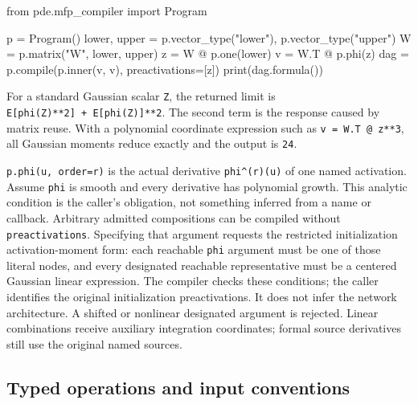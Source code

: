 \documentclass[
  11pt,
]{article}
\newenvironment{Shaded}{\begin{snugshade}}{\end{snugshade}}
\newcommand{\BuiltInTok}[1]{\textcolor[rgb]{0.00,0.23,0.31}{#1}}
\newcommand{\ImportTok}[1]{\textcolor[rgb]{0.00,0.46,0.62}{#1}}
\newcommand{\NormalTok}[1]{\textcolor[rgb]{0.00,0.23,0.31}{#1}}
\newcommand{\OperatorTok}[1]{\textcolor[rgb]{0.37,0.37,0.37}{#1}}
\newcommand{\StringTok}[1]{\textcolor[rgb]{0.13,0.47,0.30}{#1}}
\theoremstyle{definition}
\theoremstyle{plain}
\theoremstyle{plain}
\theoremstyle{plain}
\theoremstyle{remark}
\begin{document}
\begin{Shaded}
\begin{Highlighting}[]
\ImportTok{from}\NormalTok{ pde.mfp\_compiler }\ImportTok{import}\NormalTok{ Program}

\NormalTok{p }\OperatorTok{=}\NormalTok{ Program()}
\NormalTok{lower, upper }\OperatorTok{=}\NormalTok{ p.vector\_type(}\StringTok{"lower"}\NormalTok{), p.vector\_type(}\StringTok{"upper"}\NormalTok{)}
\NormalTok{W }\OperatorTok{=}\NormalTok{ p.matrix(}\StringTok{"W"}\NormalTok{, lower, upper)}
\NormalTok{z }\OperatorTok{=}\NormalTok{ W }\OperatorTok{@}\NormalTok{ p.one(lower)}
\NormalTok{v }\OperatorTok{=}\NormalTok{ W.T }\OperatorTok{@}\NormalTok{ p.phi(z)}
\NormalTok{dag }\OperatorTok{=}\NormalTok{ p.}\BuiltInTok{compile}\NormalTok{(p.inner(v, v), preactivations}\OperatorTok{=}\NormalTok{[z])}
\BuiltInTok{print}\NormalTok{(dag.formula())}
\end{Highlighting}
\end{Shaded}

For a standard Gaussian scalar \texttt{Z}, the returned limit is
\texttt{E{[}phi(Z)**2{]}\ +\ E{[}phi\textquotesingle{}(Z){]}**2}. The
second term is the response caused by matrix reuse. With a polynomial
coordinate expression such as \texttt{v\ =\ W.T\ @\ z**3}, all Gaussian
moments reduce exactly and the output is \texttt{24}.

\texttt{p.phi(u,\ order=r)} is the actual derivative
\texttt{phi\^{}(r)(u)} of one named activation. Assume \texttt{phi} is
smooth and every derivative has polynomial growth. This analytic
condition is the caller's obligation, not something inferred from a name
or callback. Arbitrary admitted compositions can be compiled without
\texttt{preactivations}. Specifying that argument requests the
restricted initialization activation-moment form: each reachable
\texttt{phi} argument must be one of those literal nodes, and every
designated reachable representative must be a centered Gaussian linear
expression. The compiler checks these conditions; the caller identifies
the original initialization preactivations. It does not infer the
network architecture. A shifted or nonlinear designated argument is
rejected. Linear combinations receive auxiliary integration coordinates;
formal source derivatives still use the original named sources.

\subsection{Typed operations and input
conventions}\label{typed-operations-and-input-conventions}
\end{document}
